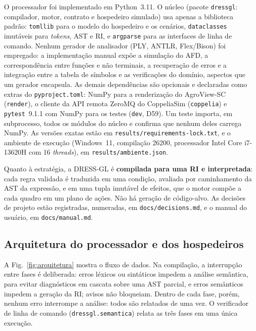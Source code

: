 \documentclass[conference]{IEEEtran}
\begin{document}
O processador foi implementado em Python~3.11. O núcleo (pacote
\texttt{dressgl}: compilador, motor, contrato e hospedeiro simulado) usa apenas
a biblioteca padrão: \texttt{tomllib} para o modelo do hospedeiro e os
cenários, \texttt{dataclasses} imutáveis para \textit{tokens}, AST e RI, e
\texttt{argparse} para as interfaces de linha de comando. Nenhum gerador de
analisador (PLY, ANTLR, Flex/Bison) foi empregado: a implementação manual expõe
a simulação do AFD, a correspondência entre funções e não terminais, a
recuperação de erros e a integração entre a tabela de símbolos e as
verificações do domínio, aspectos que um gerador encapsula. As demais
dependências são opcionais e declaradas como extras do
\texttt{pyproject.toml}: NumPy para a renderização do AgroView-SC
(\texttt{render}), o cliente da API remota ZeroMQ do CoppeliaSim
(\texttt{coppelia}) e \texttt{pytest}~9.1.1 com NumPy para os testes
(\texttt{dev}, D59). Um teste importa, em subprocesso, todos os módulos do
núcleo e confirma que nenhum deles carrega NumPy. As versões exatas estão em
\texttt{results/requirements-lock.txt}, e o ambiente de execução (Windows~11,
compilação 26200, processador Intel Core i7-13620H com 16 \textit{threads}), em
\texttt{results/ambiente.json}.

Quanto à estratégia, a DRESS-GL é \textbf{compilada para uma RI e
interpretada}: cada regra validada é traduzida em uma condição, avaliada por
caminhamento da AST da expressão, e em uma tupla imutável de efeitos, que o
motor compõe a cada quadro em um plano de ações. Não há geração de código-alvo.
As decisões de projeto estão registradas, numeradas, em
\texttt{docs/decisions.md}, e o manual do usuário, em \texttt{docs/manual.md}.

\subsection{Arquitetura do processador e dos hospedeiros}
\label{sec:arquitetura}

A Fig.~\ref{fig:arquitetura} mostra o fluxo de dados. Na compilação, a
interrupção entre fases
é deliberada: erros léxicos ou sintáticos impedem a análise semântica, para
evitar diagnósticos em cascata sobre uma AST parcial, e erros semânticos
impedem a geração da RI; avisos não bloqueiam. Dentro de cada fase, porém,
nenhum erro interrompe a análise: todos são relatados de uma vez. O verificador
de linha de comando (\texttt{dressgl.semantica}) relata as três fases em uma
única execução.
\end{document}
